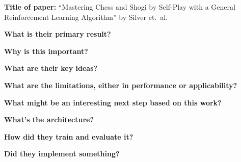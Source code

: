 \noindent \textbf{Title of paper:} ``Mastering Chess and Shogi by Self-Play with a General Reinforcement Learning Algorithm'' by Silver et.\ al.

\noindent\textbf{What is their primary result?}

\noindent\textbf{Why is this important?}

\noindent\textbf{What are their key ideas?}

\noindent\textbf{What are the limitations, either in performance or applicability?}

\noindent\textbf{What might be an interesting next step based on this work?}

\noindent\textbf{What's the architecture?}

\noindent\textbf{How did they train and evaluate it?}

\noindent\textbf{Did they implement something?}

